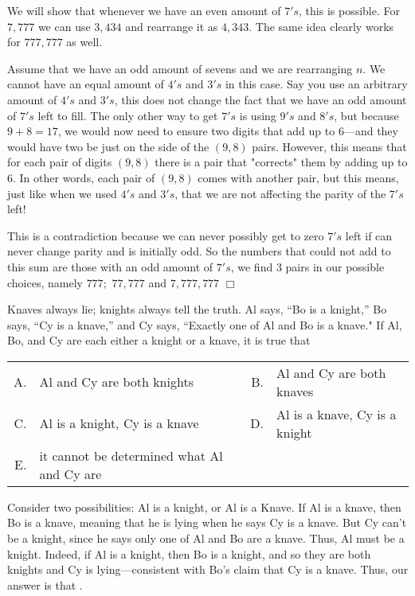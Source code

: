 \begin{solution}[D]
    We will show that whenever we have an even amount of $7's$, this is possible. For $7,777$ we can use $3,434$ and rearrange it as $4,343$. The same idea clearly works for $777,777$ as well.
    
    Assume that we have an odd amount of sevens and we are rearranging $n$. We cannot have an equal amount of $4's$ and $3's$ in this case. Say you use an arbitrary amount of $4's$ and $3's$, this does not change the fact that we have an odd amount of $7's$ left to fill. The only other way to get $7's$ is using $9's$ and $8's$, but because $9+8=17$, we would now need to ensure two digits that add up to $6$---and they would have two be just on the side of the $(9,8)$ pairs. However, this means that for each pair of digits $(9,8)$ there is a pair that "corrects" them by adding up to 6. In other words, each pair of $(9,8)$ comes with another pair, but this means, just like when we used $4's$ and $3's$, that we are not affecting the parity of the $7's$ left! 
    
    This is a contradiction because we can never possibly get to zero $7's$ left if can never change parity and is initially odd. So the numbers that could not add to this sum are those with an odd amount of $7's$, we find $3$ pairs in our possible choices, namely $777; \hspace{4pt} 77,777$ and $7,777,777$ $\Box$
\end{solution}

\begin{problem}
    Knaves always lie; knights always tell the truth. Al says, “Bo is a knight,” Bo says, “Cy is a knave,” and Cy says, “Exactly one of Al and Bo is a knave." If Al, Bo, and Cy are each either a knight or a knave, it is true that
\end{problem}\smallbreak\vspace{2pt}
\begin{tabular}{r@{ }l @{\hskip 1cm} r@{ }l}
    A. & Al and Cy are both knights  & B. & Al and Cy are both knaves \\
    C. & Al is a knight, Cy is a knave  & D. & Al is a knave, Cy is a knight \\
    E. & it cannot be determined what Al and Cy are &
\end{tabular}

\begin{solution}[C]
    Consider two possibilities: Al is a knight, or Al is a Knave. If Al is a knave, then Bo is a knave, meaning that he is lying when he says Cy is a knave. But Cy can't be a knight, since he says only one of Al and Bo are a knave. Thus, Al must be a knight. Indeed, if Al is a knight, then Bo is a knight, and so they are both knights and Cy is lying---consistent with Bo's claim that Cy is a knave. Thus, our answer is that .
\end{solution}

